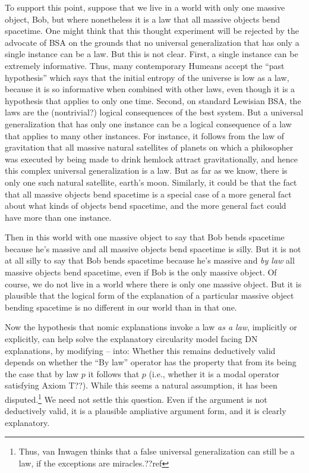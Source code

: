 To support this point, suppose that we live in a world with only one massive object, Bob, but where nonetheless it is a law that all massive objects
bend spacetime. One might think that this thought experiment will be rejected by the advocate of BSA on the grounds that no 
universal generalization that has only a single instance can be a law. But this is not clear. First, a single instance can be
extremely informative. Thus, many contemporary Humeans accept the ``past hypothesis'' which says that the initial entropy of the
universe is low as a law, because it is so informative when combined with other laws, even though it is a hypothesis that applies
to only one time. Second, on standard Lewisian BSA, the laws are the (nontrivial?) logical consequences of the best system. But a universal 
generalization that has only one instance can be a logical consequence of a law that applies to many other instances. For instance,
it follows from the law of gravitation that all massive natural satellites of planets on which a philosopher was executed by being
made to drink hemlock attract gravitationally, and hence this complex universal generalization is a law. But as far as we know, 
there is only one such natural satellite, earth's moon. Similarly, it could be that the fact that all massive objects bend spacetime 
is a special case of a more general fact about what kinds of objects bend spacetime, and the more general fact could have
more than one instance. 

Then in this world with one massive object to say that Bob bends spacetime because he's massive and all massive objects bend spacetime 
is  silly. But it is not at all silly to say that Bob bends spacetime because he's massive and \textit{by law} all massive objects bend
spacetime,  even if Bob is the only massive object. Of course, we do not live in a world where there is only one massive object.
But it is plausible that the logical form of the explanation of a particular massive object bending spacetime is no different in 
our world than in that one.

Now the hypothesis that nomic explanations invoke a law \textit{as a law}, implicitly or explicitly, can help solve the explanatory 
circularity model facing DN explanations, by modifying -- into:
Whether this remains deductively valid depends on whether the ``By law'' operator has the property that from its being the case that
by law $p$ it follows that $p$ (i.e., whether it is a modal operator satisfying Axiom T??). While this seems a natural assumption, it 
has been disputed.\footnote{Thus, van Inwagen thinks that a false universal generalization can still be a law, if the exceptions are 
miracles.??ref} We need not settle this question. Even if the argument is not deductively valid, it is a plausible ampliative argument
form, and it is clearly explanatory.

